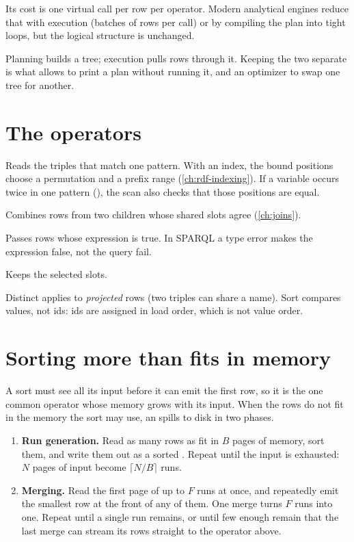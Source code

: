 Its cost is one virtual call per row per operator. Modern analytical engines
reduce that with  execution (batches of rows per call) or by
compiling the plan into tight loops, but the logical structure is unchanged.

\begin{keyidea}
Planning builds a tree; execution pulls rows through it. Keeping the two
separate is what allows  to print a plan without
running it, and an optimizer to swap one tree for another.
\end{keyidea}

\section{The operators}

\begin{description}[leftmargin=1.2em]
\item[Triple scan.] Reads the triples that match one pattern. With an index, the bound positions choose a permutation and a prefix range (\cref{ch:rdf-indexing}). If a variable occurs twice in one pattern (), the scan also checks that those positions are equal.
\item[Join.] Combines rows from two children whose shared slots agree (\cref{ch:joins}).
\item[Filter.] Passes rows whose expression is true. In SPARQL a type error makes the expression false, not the query fail.
\item[Projection.] Keeps the selected slots.
\item[Distinct, limit, offset, sort.] Distinct applies to \emph{projected} rows (two triples can share a name). Sort compares values, not ids: ids are assigned in load order, which is not value order.
\end{description}

\section{Sorting more than fits in memory}

A sort must see all its input before it can emit the first row, so it is the
one common operator whose memory grows with its input. When the rows do not fit
in the memory the sort may use, an  spills to disk in
two phases.

\begin{enumerate}
\item \textbf{Run generation.} Read as many rows as fit in $B$ pages of memory,
sort them, and write them out as a sorted . Repeat until the input is
exhausted: $N$ pages of input become $\lceil N/B \rceil$ runs.
\item \textbf{Merging.} Read the first page of up to $F$ runs at once, and
repeatedly emit the smallest row at the front of any of them. One merge turns
$F$ runs into one. Repeat until a single run remains, or until few enough remain
that the last merge can stream its rows straight to the operator above.
\end{enumerate}

